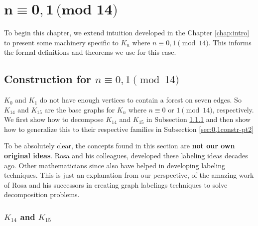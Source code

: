 \chapter{$\mathbf{n\equiv 0,1\,\textbf{(mod 14)}}$} \label{chap:0,1(mod 14)}

To begin this chapter, we extend intuition developed in the Chapter \ref{chap:intro} to present some machinery specific to $K_{n}$ where $n\equiv 0,1\pmod{14}$. This informs the formal definitions and theorems we use for this case.

\section{Construction for $n\equiv 0,1 \pmod{14}$}\label{sec:0,1constr}
$K_{0}$ and $K_{1}$ do not have enough vertices to contain a forest on seven edges. So $K_{14}$ and $K_{15}$ are the base graphs for $K_{n}$ where $n \equiv 0 \textrm{ or } 1 \pmod{14}$, respectively. We first show how to decompose $K_{14}$ and $K_{15}$ in Subsection \ref{sec:0,1constr-pt1} and then show how to generalize this to their respective families in Subsection \ref{sec:0,1constr-pt2}

To be absolutely clear, the concepts found in this section are \textbf{not our own original ideas}. Rosa and his colleagues, developed these labeling ideas decades ago. Other mathematicians since also have helped in developing labeling techniques. This is just an explanation from our perspective, of the amazing work of Rosa and his successors in creating graph labelings techniques to solve decomposition problems.

\subsection{$K_{14}$ and $K_{15}$}\label{sec:0,1constr-pt1}


